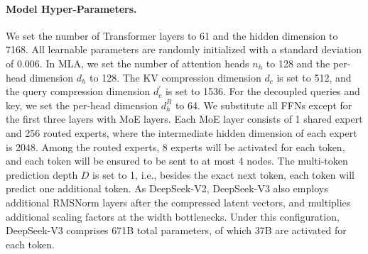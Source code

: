 \documentclass[11pt, a4paper, logo, copyright, nonumbering]{deepseek}
\newcommand{\dsvii}{DeepSeek-V2}
\newcommand{\dsattn}{MLA}
\newcommand{\dsviii}{DeepSeek-V3}
\begin{document}
\begin{CJK*}{UTF8}{gbsn}
\paragraph{Model Hyper-Parameters.}
We set the number of Transformer layers to 61 and the hidden dimension to 7168. 
All learnable parameters are randomly initialized with a standard deviation of 0.006.
In \dsattn{}, we set the number of attention heads $n_h$ to 128 and the per-head dimension $d_h$ to 128. 
The KV compression dimension $d_c$ is set to 512, and the query compression dimension $d_c^{\prime}$ is set to 1536. 
For the decoupled queries and key, we set the per-head dimension $d_h^R$ to 64. 
We substitute all FFNs except for the first three layers with MoE layers. 
Each MoE layer consists of 1 shared expert and 256 routed experts, where the intermediate hidden dimension of each expert is 2048. 
Among the routed experts, 8 experts will be activated for each token, and each token will be ensured to be sent to at most 4 nodes. 
The multi-token prediction depth $D$ is set to 1, i.e., besides the exact next token, each token will predict one additional token. 
As \dsvii{}, \dsviii{} also employs additional RMSNorm layers after the compressed latent vectors, and multiplies additional scaling factors at the width bottlenecks. 
Under this configuration, \dsviii{} comprises 671B total parameters, of which 37B are activated for each token. 


\end{CJK*}
\end{document}
